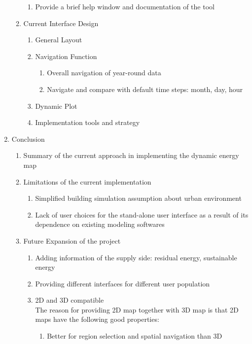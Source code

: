 \documentclass[12pt]{article}
\begin{document}
\begin{enumerate}
\begin{enumerate}[label*=\arabic*.]
\begin{enumerate}[label*=\arabic*.]
    \item Provide a brief help window and documentation of the tool
    \end{enumerate}
  \item Current Interface Design
    \begin{enumerate}[label*=\arabic*.]
    \item General Layout
    \item Navigation Function
      \begin{enumerate}[label*=\arabic*.]
      \item Overall navigation of year-round data
      \item Navigate and compare with default time steps: month, day,
        hour
      \end{enumerate}
    \item Dynamic Plot
    \item Implementation tools and strategy
    \end{enumerate}
  \end{enumerate}
\item Conclusion
  \begin{enumerate}[label*=\arabic*.]
  \item Summary of the current approach in implementing the dynamic
    energy map
  \item Limitations of the current implementation
    \begin{enumerate}[label*=\arabic*.]
    \item Simplified building simulation assumption about urban
      environment
    \item Lack of user choices for the stand-alone user interface as a
      result of its dependence on existing modeling softwares
    \end{enumerate}
  \item Future Expansion of the project
    \begin{enumerate}[label*=\arabic*.]
    \item Adding information of the supply side: residual energy,
      sustainable energy
    \item Providing different interfaces for different user population
    \item 2D and 3D compatible \\The reason for providing 2D map
      together with 3D map is that 2D maps have the following good
      properties:
      \begin{enumerate}[label*=\arabic*.]
      \item Better for region selection and spatial navigation than 3D

\end{enumerate}
\end{enumerate}
\end{enumerate}
\end{enumerate}
\end{document}
